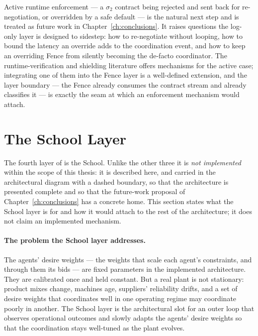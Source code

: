 Active runtime enforcement --- a $\sigma_2$ contract being rejected and
sent back for re-negotiation, or overridden by a safe default --- is the
natural next step and is treated as future work in
Chapter~\ref{ch:conclusions}. It raises questions the log-only layer is
designed to sidestep: how to re-negotiate without looping, how to bound
the latency an override adds to the coordination event, and how to keep
an overriding Fence from silently becoming the de-facto coordinator. The
runtime-verification and shielding literature
\cite{raju2020runtime,alshiekh2017,konighofer2019shields} offers
mechanisms for the active case; integrating one of them into the Fence
layer is a well-defined extension, and the layer boundary --- the Fence
already consumes the contract stream and already classifies it --- is
exactly the seam at which an enforcement mechanism would attach.

\section{The School Layer}
\label{sec:arch-school}

The fourth layer of \NEXUS{} is the School. Unlike the other three it is
\emph{not implemented} within the scope of this thesis: it is described
here, and carried in the architectural diagram with a dashed boundary,
so that the architecture is presented complete and so that the
future-work proposal of Chapter~\ref{ch:conclusions} has a concrete
home. This section states what the School layer is for and how it would
attach to the rest of the architecture; it does not claim an
implemented mechanism.

\paragraph{The problem the School layer addresses.}
The agents' desire weights --- the weights that scale each agent's
constraints, and through them its bids --- are fixed parameters in the
implemented architecture. They are calibrated once and held constant.
But a real plant is not stationary: product mixes change, machines age,
suppliers' reliability drifts, and a set of desire weights that
coordinates well in one operating regime may coordinate poorly in
another. The School layer is the architectural slot for an outer loop
that observes operational outcomes and slowly adapts the agents' desire
weights so that the coordination stays well-tuned as the plant
evolves.

